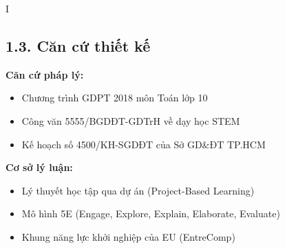 \documentclass[12pt,a4paper]{article}
\begin{document}
\begin{competitionsection}{I}
\subsection*{1.3. Căn cứ thiết kế}
\begin{minipage}{0.48\textwidth}
\textbf{Căn cứ pháp lý:}
\begin{itemize}[leftmargin=*,noitemsep]
\item Chương trình GDPT 2018 môn Toán lớp 10
\item Công văn 5555/BGDĐT-GDTrH về dạy học STEM
\item Kế hoạch số 4500/KH-SGDĐT của Sở GD\&ĐT TP.HCM
\end{itemize}
\end{minipage}
\hfill
\begin{minipage}{0.48\textwidth}
\textbf{Cơ sở lý luận:}
\begin{itemize}[leftmargin=*,noitemsep]
\item Lý thuyết học tập qua dự án (Project-Based Learning)
\item Mô hình 5E (Engage, Explore, Explain, Elaborate, Evaluate)
\item Khung năng lực khởi nghiệp của EU (EntreComp)
\end{itemize}
\end{minipage}


\end{competitionsection}
\end{document}
